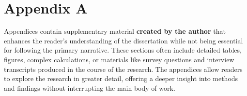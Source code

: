 \chapter{Appendix A}
Appendices contain supplementary material \textbf{created by the author} that enhances the reader’s understanding of the dissertation while not being essential for following the primary narrative. These sections often include detailed tables, figures, complex calculations, or materials like survey questions and interview transcripts produced in the course of the research. The appendices allow readers to explore the research in greater detail, offering a deeper insight into methods and findings without interrupting the main body of work.